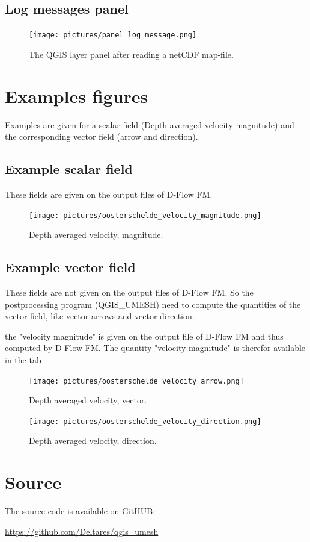 \documentclass{deltares_memo}
\newcommand{\dflowfm}{D-Flow FM\xspace}
\newcommand{\qumesh}{QGIS\_UMESH\xspace}
\newcommand{\qgis}{QGIS\xspace}
\newcommand{\netcdf}{netCDF\xspace}
\begin{document}
\subsection{Log messages panel}
\begin{figure}[H]
	\centering    
	\texttt{[image: pictures/panel\_log\_message.png]}
	\caption{The \qgis layer panel after reading a \netcdf map-file.\label{fig:panel_layer}}
\end{figure}
\section{Examples figures}
Examples are given for a scalar field (Depth averaged velocity magnitude) and the corresponding vector field (arrow and direction).
\subsection{Example scalar field}
These fields are given on the output files of \dflowfm.
\begin{figure}[H]
	\centering    
	\texttt{[image: pictures/oosterschelde\_velocity\_magnitude.png]}
	\caption{Depth averaged velocity, magnitude.\label{fig:velocity_magnitude}}
\end{figure}
\subsection{Example vector field}
These fields are not given on the output files of \dflowfm.
So the postprocessing program (\qumesh) need to compute the quantities of the vector field, like vector arrows and vector direction. 

\Note the "velocity magnitude" is given on the output file of \dflowfm and thus computed by \dflowfm.
The quantity "velocity magnitude" is therefor available in the tab 
\begin{figure}[H]
	\centering    
	\texttt{[image: pictures/oosterschelde\_velocity\_arrow.png]}
	\caption{Depth averaged velocity, vector.\label{fig:velocity_vector}}
\end{figure}

\begin{figure}[H]
	\centering    
	\texttt{[image: pictures/oosterschelde\_velocity\_direction.png]}
	\caption{Depth averaged velocity, direction.\label{fig:velocity_vector_direction}}
\end{figure}
\section{Source}
The source code is available on GitHUB:

\url{https://github.com/Deltares/qgis_umesh}
\end{document}
